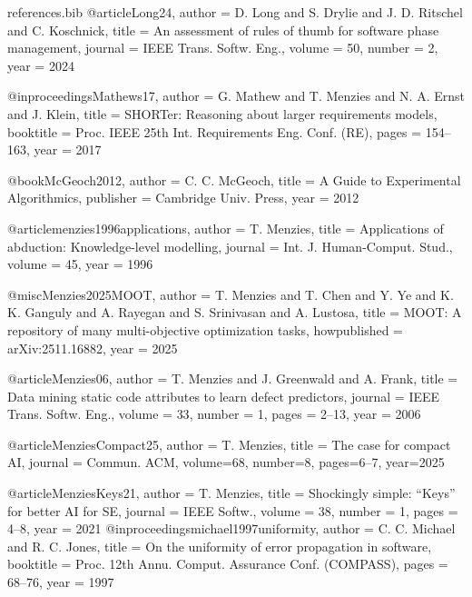 \documentclass[pdflatex,sn-basic]{sn-jnl}
\begin{document}
\begin{filecontents}{references.bib}
@article{Long24,
  author  = {D. Long and S. Drylie and J. D. Ritschel and C. Koschnick},
  title   = {An assessment of rules of thumb for software phase management},
  journal = {IEEE Trans. Softw. Eng.},
  volume  = {50},
  number  = {2},
  year    = {2024}
}



@inproceedings{Mathews17,
  author    = {G. Mathew and T. Menzies and N. A. Ernst and J. Klein},
  title     = {SHORTer: Reasoning about larger requirements models},
  booktitle = {Proc. IEEE 25th Int. Requirements Eng. Conf. (RE)},
  pages     = {154--163},
  year      = {2017}
}

@book{McGeoch2012,
  author    = {C. C. McGeoch},
  title     = {A Guide to Experimental Algorithmics},
  publisher = {Cambridge Univ. Press},
  year      = {2012}
}



@article{menzies1996applications,
  author  = {T. Menzies},
  title   = {Applications of abduction: Knowledge-level modelling},
  journal = {Int. J. Human-Comput. Stud.},
  volume  = {45},
  year    = {1996}
}



@misc{Menzies2025MOOT,
  author = {T. Menzies and T. Chen and Y. Ye and K. K. Ganguly and A. Rayegan and S. Srinivasan and A. Lustosa},
  title  = {MOOT: A repository of many multi-objective optimization tasks},
  howpublished = {arXiv:2511.16882},
  year   = {2025}
}



@article{Menzies06,
  author  = {T. Menzies and J. Greenwald and A. Frank},
  title   = {Data mining static code attributes to learn defect predictors},
  journal = {IEEE Trans. Softw. Eng.},
  volume  = {33},
  number  = {1},
  pages   = {2--13},
  year    = {2006}
}

@article{MenziesCompact25,
  author  = {T. Menzies},
  title   = {The case for compact AI},
  journal = {Commun. ACM},
  volume={68},
  number={8},
  pages={6--7},
  year={2025}
}

@article{MenziesKeys21,
  author  = {T. Menzies},
  title   = {Shockingly simple: ``Keys'' for better AI for SE},
  journal = {IEEE Softw.},
  volume  = {38},
  number  = {1},
  pages   = {4--8},
  year    = {2021}
}
@inproceedings{michael1997uniformity,
  author    = {C. C. Michael and R. C. Jones},
  title     = {On the uniformity of error propagation in software},
  booktitle = {Proc. 12th Annu. Comput. Assurance Conf. (COMPASS)},
  pages     = {68--76},
  year      = {1997}
}


\end{filecontents}
\end{document}
